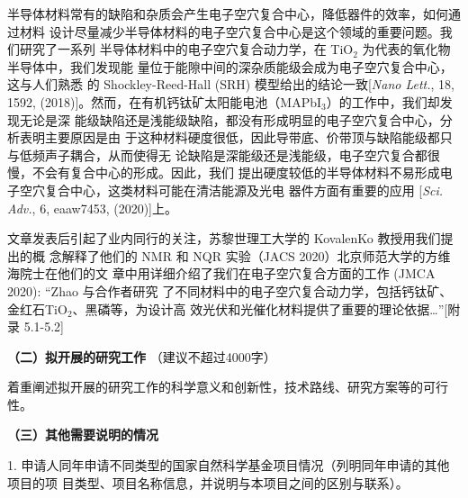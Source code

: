 \documentclass[12pt,UTF8,AutoFakeBold=3,a4paper]{article}
\newcommand{\sihao}{\fontsize{14pt}{\baselineskip}\selectfont}
\begin{document}
\begin{enumerate}[label=\textnormal{\color{EmphColor}\Roman*.}]
  半导体材料常有的缺陷和杂质会产生电子空穴复合中心，降低器件的效率，如何通过材料
  设计尽量减少半导体材料的电子空穴复合中心是这个领域的重要问题。我们研究了一系列
  半导体材料中的电子空穴复合动力学，在 TiO$_2$ 为代表的氧化物半导体中，我们发现能
  量位于能隙中间的深杂质能级会成为电子空穴复合中心，这与人们熟悉
  的 Shockley-Reed-Hall (SRH) 模型给出的结论一致[\textit{Nano Lett.}, 18, 1592,
  (2018)]。然而，在有机钙钛矿太阳能电池（MAPbI$_3$）的工作中，我们却发现无论是深
  能级缺陷还是浅能级缺陷，都没有形成明显的电子空穴复合中心，分析表明主要原因是由
  于这种材料硬度很低，因此导带底、价带顶与缺陷能级都只与低频声子耦合，从而使得无
  论缺陷是深能级还是浅能级，电子空穴复合都很慢，不会有复合中心的形成。因此，我们
  提出硬度较低的半导体材料不易形成电子空穴复合中心，这类材料可能在清洁能源及光电
  器件方面有重要的应用 [\textit{Sci. Adv.}, 6, eaaw7453, (2020)]上。

  \begin{justify} \kaishu\color{magenta}{}

    文章发表后引起了业内同行的关注，苏黎世理工大学的 KovalenKo 教授用我们提出的概
    念解释了他们的 NMR 和 NQR 实验（JACS 2020）北京师范大学的方维海院士在他们的文
    章中用详细介绍了我们在电子空穴复合方面的工作 (JMCA 2020): “Zhao 与合作者研究
    了不同材料中的电子空穴复合动力学，包括钙钛矿、金红石TiO$_2$、黑磷等，为设计高
    效光伏和光催化材料提供了重要的理论依据\ldots{}”[附录 5.1-5.2]
  \end{justify} 
  
\end{enumerate}

{\kaishu{}\sihao{}
  \textcolor{NsfcBlue}
  {\bfseries{}（二）拟开展的研究工作}
  \color{NsfcBlue}（建议不超过4000字）
}

{\kaishu{}\sihao{}
  \color{NsfcBlue}
  着重阐述拟开展的研究工作的科学意义和创新性，技术路线、研究方案等的可行性。
}


{\kaishu{}\sihao{}
  \textcolor{NsfcBlue}
  {\bfseries{}（三）其他需要说明的情况}
}


{\kaishu{}\sihao{} \color{NsfcBlue}
1. 申请人同年申请不同类型的国家自然科学基金项目情况（列明同年申请的其他项目的项
目类型、项目名称信息，并说明与本项目之间的区别与联系）。
}
\end{document}

